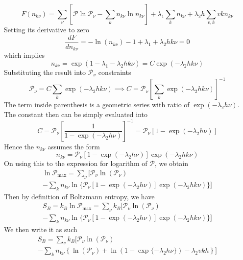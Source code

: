 \documentclass[../../../Main.tex]{subfiles}
\begin{document}
\begin{equation*}
    F(n_{k\nu})=\sum_\nu \left[\mathcal{P}\ln \mathcal{P}_\nu - \sum_{k} n_{k\nu}\ln n_{k\nu} \right]+ 
    \lambda_1\sum_{k}n_{k\nu}+
    \lambda_2h\sum_{v,k}vkn_{k\nu}
\end{equation*}
Setting its derivative to zero
\begin{equation*}
    \frac{dF}{dn_{k\nu}}=-\ln(n_{k\nu})-1+\lambda_1+\lambda_2hk\nu=0
\end{equation*}
which implies
\begin{equation*}
    n_{k\nu}=\exp\left(1-\lambda_1-\lambda_2hk\nu\right)=C\exp\left(-\lambda_2hk\nu\right)
\end{equation*}
Substituting the result into $\mathcal{P}_\nu$ constraints
\begin{equation*}
    \mathcal{P}_\nu=C\sum_{k } \exp\left(-\lambda_2hk\nu\right) \implies C=\mathcal{P}_\nu\left[\sum_{k } \exp\left(-\lambda_2hk\nu\right)\right]^{-1}
\end{equation*}
The term inside parenthesis is a geometric series with ratio of $\exp(-\lambda_2h\nu)$. The constant then can be simply evaluated into 
\begin{equation*}
    C=\mathcal{P}_\nu\left[\frac{1}{1-\exp(-\lambda_2h\nu)}\right]^{-1} = \mathcal{P}_\nu\left[1-\exp(-\lambda_2h\nu)\right]
\end{equation*}
Hence the $n_{k\nu}$ assumes the form 
\begin{equation*}
    n_{k\nu}=\mathcal{P}_\nu\left[1-\exp(-\lambda_2h\nu)\right]\exp\left(-\lambda_2hk\nu\right)
\end{equation*}
On using this to the expression for logarithm of $\mathcal{P}$, we obtain
\begin{multline*}
    \ln \mathcal{P}_{\max}= \sum_\nu \bigg[ \mathcal{P}_\nu \ln \left(\mathcal{P}_\nu\right) \\
    - \sum_{k} n_{k\nu}\ln \{\mathcal{P}_\nu\left[1-\exp(-\lambda_2h\nu)\right]\exp\left(-\lambda_2hk\nu\right) \} \bigg]
\end{multline*}
Then by definition of Boltzmann entropy, we have
\begin{multline*}
    S_B=k_B \ln \mathcal{P}_{\max}= \sum_\nu k_B \bigg[ \mathcal{P}_\nu \ln \left(\mathcal{P}_\nu\right) \\
    - \sum_{k} n_{k\nu}\ln \{\mathcal{P}_\nu\left[1-\exp(-\lambda_2h\nu)\right]\exp\left(-\lambda_2hk\nu\right) \} \bigg]
\end{multline*}
We then write it as such 
\begin{multline*}
    S_B= \sum_\nu k_B \bigg[ \mathcal{P}_\nu \ln \left(\mathcal{P}_\nu\right) \\
    - \sum_{k} n_{k\nu}\left\{\ln(\mathcal{P}_\nu)+\ln (1-\exp\{-\lambda_2h\nu\})-\lambda_2vkh\right\} \bigg]
\end{multline*}
\end{document}
